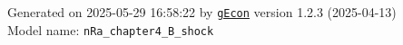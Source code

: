 \documentclass[10pt,a4paper]{article}
\numberwithin{equation}{section}
\begin{document}
\begin{flushleft}{\large
Generated  on 2025-05-29 16:58:22 by \href{http://gecon.r-forge.r-project.org/}{\texttt{gEcon}} version 1.2.3 (2025-04-13)\\
Model name: \verb+nRa_chapter4_B_shock+
}\end{flushleft}



\end{document}
